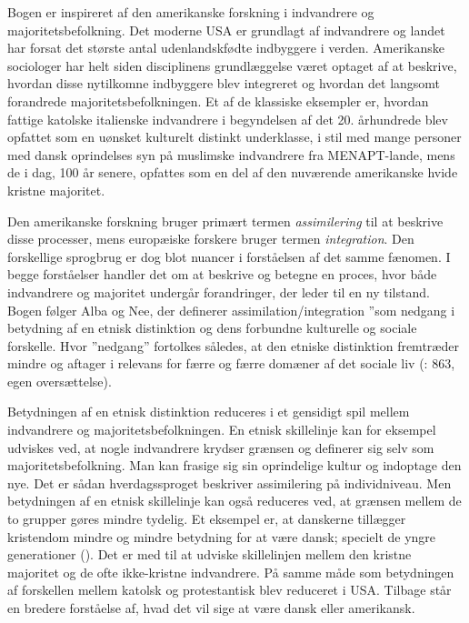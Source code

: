 \documentclass[
]{book}
\begin{document}
Bogen er inspireret af den amerikanske forskning i indvandrere og majoritetsbefolkning. Det moderne USA er grundlagt af indvandrere og landet har forsat det største antal udenlandskfødte indbyggere i verden. Amerikanske sociologer har helt siden disciplinens grundlæggelse været optaget af at beskrive, hvordan disse nytilkomne indbyggere blev integreret og hvordan det langsomt forandrede majoritetsbefolkningen. Et af de klassiske eksempler er, hvordan fattige katolske italienske indvandrere i begyndelsen af det 20. århundrede blev opfattet som en uønsket kulturelt distinkt underklasse, i stil med mange personer med dansk oprindelses syn på muslimske indvandrere fra MENAPT-lande, mens de i dag, 100 år senere, opfattes som en del af den nuværende amerikanske hvide kristne majoritet.

Den amerikanske forskning bruger primært termen \emph{assimilering} til at beskrive disse processer, mens europæiske forskere bruger termen \emph{integration}. Den forskellige sprogbrug er dog blot nuancer i forståelsen af det samme fænomen. I begge forståelser handler det om at beskrive og betegne en proces, hvor både indvandrere og majoritet undergår forandringer, der leder til en ny tilstand. Bogen følger Alba og Nee, der definerer assimilation/integration ''som nedgang i betydning af en etnisk distinktion og dens forbundne kulturelle og sociale forskelle. Hvor ''nedgang'' fortolkes således, at den etniske distinktion fremtræder mindre og aftager i relevans for færre og færre domæner af det sociale liv (: 863, egen oversættelse).

Betydningen af en etnisk distinktion reduceres i et gensidigt spil mellem indvandrere og majoritetsbefolkningen. En etnisk skillelinje kan for eksempel udviskes ved, at nogle indvandrere krydser grænsen og definerer sig selv som majoritetsbefolkning. Man kan frasige sig sin oprindelige kultur og indoptage den nye. Det er sådan hverdagssproget beskriver assimilering på individniveau. Men betydningen af en etnisk skillelinje kan også reduceres ved, at grænsen mellem de to grupper gøres mindre tydelig. Et eksempel er, at danskerne tillægger kristendom mindre og mindre betydning for at være dansk; specielt de yngre generationer (). Det er med til at udviske skillelinjen mellem den kristne majoritet og de ofte ikke-kristne indvandrere. På samme måde som betydningen af forskellen mellem katolsk og protestantisk blev reduceret i USA. Tilbage står en bredere forståelse af, hvad det vil sige at være dansk eller amerikansk.
\end{document}
